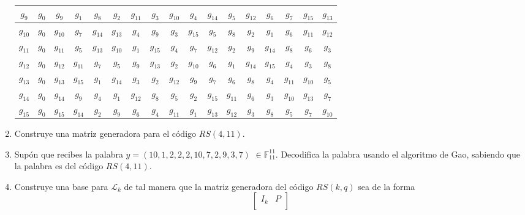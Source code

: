 \documentclass[letterpaper,10pt]{article}
\begin{document}
\begin{enumerate}
\begin{table}[h]
\begin{center}
\begin{tabular}{|c|c|c|c|c|c|c|c|c|c|c|c|c|c|c|c|c|}
    $g_{9}$ & $g_{0}$ & $g_{9}$ & $g_{1}$ & $g_{8}$ & $g_{2}$ & $g_{11}$ & 
    $g_{3}$ & $g_{10}$ & $g_{4}$ & $g_{14}$ & $g_{5}$ & $g_{12}$ & $g_{6}$ & 
    $g_{7}$ & $g_{15}$ & $g_{13}$ \\ \hline
    $g_{10}$ & $g_{0}$ & $g_{10}$ & $g_{7}$ & $g_{14}$ & $g_{13}$ & $g_{4}$ & 
    $g_{9}$ & $g_{3}$ & $g_{15}$ & $g_{5}$ & $g_{8}$ & $g_{2}$ & $g_{1}$ & 
    $g_{6}$ & $g_{11}$ & $g_{12}$ \\ \hline
    $g_{11}$ & $g_{0}$ & $g_{11}$ & $g_{5}$ & $g_{13}$ & $g_{10}$ & $g_{1}$ & 
    $g_{15}$ & $g_{4}$ & $g_{7}$ & $g_{12}$ & $g_{2}$ & $g_{9}$ & $g_{14}$ &
    $g_{8}$ & $g_{6}$ & $g_{3}$ \\ \hline
    $g_{12}$ & $g_{0}$ & $g_{12}$ & $g_{11}$ & $g_{7}$ & $g_{5}$ & $g_{9}$ & 
    $g_{13}$ & $g_{2}$ & $g_{10}$ & $g_{6}$ & $g_{1}$ & $g_{14}$ & $g_{15}$ & 
    $g_{4}$ & $g_{3}$ & $g_{8}$ \\ \hline
    $g_{13}$ & $g_{0}$ & $g_{13}$ & $g_{15}$ & $g_{1}$ & $g_{14}$ & $g_{3}$ & 
    $g_{2}$ & $g_{12}$ & $g_{9}$ & $g_{7}$ & $g_{6}$ & $g_{8}$ & $g_{4}$ & 
    $g_{11}$ & $g_{10}$ & $g_{5}$ \\ \hline
    $g_{14}$ & $g_{0}$ & $g_{14}$ & $g_{9}$ & $g_{4}$ & $g_{1}$ & $g_{12}$ & 
    $g_{8}$ & $g_{5}$ & $g_{2}$ & $g_{15}$ & $g_{11}$ & $g_{6}$ & $g_{3}$ & 
    $g_{10}$ & $g_{13}$ & $g_{7}$  \\ \hline
    $g_{15}$ & $g_{0}$ & $g_{15}$ & $g_{14}$ & $g_{2}$ & $g_{9}$ & $g_{6}$ & 
    $g_{4}$ & $g_{11}$ & $g_{1}$ & $g_{13}$ & $g_{12}$ & $g_{3}$ & $g_{8}$ & 
    $g_{5}$ & $g_{7}$ & $g_{10}$  \\ \hline
    \end{tabular}
    \end{center}
    \end{table}
    
    \item Construye una matriz generadora para el código $RS(4,11)$. 
    
    \item Supón que recibes la palabra $y = (10, 1, 2, 2, 2, 10, 7, 2, 9, 3, 7)$
    $\in \mathbb{F}^{11}_{11}$. Decodifica la palabra usando el algoritmo de
    Gao, sabiendo que la palabra es del código $RS(4,11)$.
    
    \item Construye una base para $\mathcal{L}_{k}$ de tal manera que la matriz
    generadora del código $RS(k, q)$ sea de la forma 
    \begin{equation}
    \begin{bmatrix}
    I_{k} & P\\
    \end{bmatrix}
    \end{equation}
    

\end{enumerate}
\end{document}
